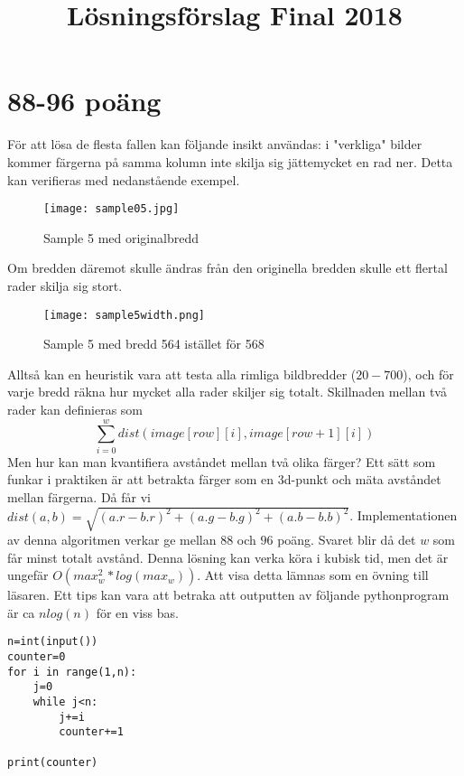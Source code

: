 \documentclass{article}
\title{Lösningsförslag Final 2018}
\date{}
\begin{document}
\maketitle

\section*{88-96 poäng}
För att lösa de flesta fallen kan följande insikt användas: i "verkliga" bilder kommer färgerna på samma kolumn inte skilja sig jättemycket en rad ner. Detta kan verifieras med nedanstående exempel.
\begin{figure}[h!]
    \centering
    \texttt{[image: sample05.jpg]}\\
\caption{Sample 5 med originalbredd}
\end{figure}

Om bredden däremot skulle ändras från den originella bredden skulle ett flertal rader skilja sig stort.
\clearpage
\begin{figure}[h!]
    \centering
    \texttt{[image: sample5width.png]}\\
\caption{Sample 5 med bredd 564 istället för 568}
\end{figure}
Alltså kan en heuristik vara att testa alla rimliga bildbredder ($20-700$), och för varje bredd räkna hur mycket alla rader skiljer sig totalt. Skillnaden mellan två rader kan definieras som \[ \sum_{i=0}^{w} dist(image[row][i], image[row+1][i]) \]  Men hur kan man kvantifiera avståndet mellan två olika färger? Ett sätt som funkar i praktiken är att betrakta färger som en 3d-punkt och mäta avståndet mellan färgerna. Då får vi $dist(a,b)=\sqrt{(a.r-b.r)^2+(a.g-b.g)^2+(a.b-b.b)^2}$. Implementationen av denna algoritmen verkar ge mellan $88$ och $96$ poäng. Svaret blir då det $w$ som får minst totalt avstånd. Denna lösning kan verka köra i kubisk tid, men det är ungefär $O(max_w^2*log(max_w))$. Att visa detta lämnas som en övning till läsaren. Ett tips kan vara att betraka att outputten av följande pythonprogram är ca $nlog(n)$ för en viss bas.

\begin{verbatim}
n=int(input())
counter=0
for i in range(1,n):
    j=0
    while j<n:
        j+=i
        counter+=1

print(counter)
\end{verbatim}



\clearpage
\end{document}
